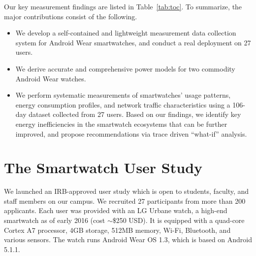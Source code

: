 Our key measurement findings are listed in Table~\ref{tab:toc}. 
To summarize, the major contributions consist of the following.
\begin{itemize}
	\item We develop a self-contained and lightweight measurement data
	collection system for Android Wear smartwatches, and conduct a
	real deployment on 27 users.
	\item We derive accurate and comprehensive power models for two
	commodity Android Wear watches.
	\item We perform systematic measurements of smartwatches’ usage
	patterns, energy consumption profiles, and network traffic characteristics
	using a 106-day dataset collected from 27 users. Based on
	our findings, we identify key energy inefficiencies in the smartwatch ecosystems
	that can be further improved, and propose recommendations via trace driven ``what-if'' analysis.
\end{itemize}



\section{The Smartwatch User Study}
We launched an IRB-approved user study which is open to students, faculty, and staff members on our campus. We recruited 27
participants from more than 200 applicants.
%
Each user was provided with an LG Urbane watch, a high-end smartwatch as of early 2016 (cost $\sim$\$250 USD). It is equipped with a quad-core Cortex A7 processor, 4GB storage, 512MB memory, Wi-Fi, Bluetooth, and various sensors. The watch runs Android Wear OS 1.3, which is based on Android 5.1.1.

